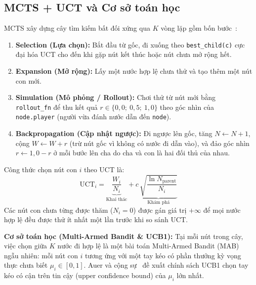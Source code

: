 \documentclass[conference]{IEEEtran}
\begin{document}
\subsection{MCTS + UCT và Cơ sở toán học}
MCTS xây dựng cây tìm kiếm bất đối xứng qua $K$ vòng lặp gồm bốn bước~\cite{coulom2006,kocsis2006}:
\begin{enumerate}
    \item \textbf{Selection (Lựa chọn):} Bắt đầu từ gốc, đi xuống theo \texttt{best\_child(c)} cực đại hóa UCT cho đến khi gặp nút kết thúc hoặc nút chưa mở rộng hết.
    \item \textbf{Expansion (Mở rộng):} Lấy một nước hợp lệ chưa thử và tạo thêm một nút con mới.
    \item \textbf{Simulation (Mô phỏng / Rollout):} Chơi thử từ nút mới bằng \texttt{rollout\_fn} để thu kết quả $r \in \{0{,}0;\ 0{,}5;\ 1{,}0\}$ theo góc nhìn của \texttt{node.player} (người vừa đánh nước dẫn đến \texttt{node}).
    \item \textbf{Backpropagation (Cập nhật ngược):} Đi ngược lên gốc, tăng $N \leftarrow N + 1$, cộng $W \leftarrow W + r$ (trừ nút gốc vì không có nước đi dẫn vào), và đảo góc nhìn $r \leftarrow 1{,}0 - r$ ở mỗi bước lên cha do cha và con là hai đối thủ của nhau.
\end{enumerate}

Công thức chọn nút con $i$ theo UCT là:
\begin{equation}
\text{UCT}_i = \underbrace{\frac{W_i}{N_i}}_{\text{Khai thác}} + c\,\underbrace{\sqrt{\frac{\ln N_{\mathrm{parent}}}{N_i}}}_{\text{Khám phá}}
\label{eq:uct}
\end{equation}
Các nút con chưa từng được thăm ($N_i = 0$) được gán giá trị $+\infty$ để mọi nước hợp lệ đều được thử ít nhất một lần trước khi so sánh UCT.

\textbf{Cơ sở toán học (Multi-Armed Bandit \& UCB1):} Tại mỗi nút trong cây, việc chọn giữa $K$ nước đi hợp lệ là một bài toán Multi-Armed Bandit (MAB) ngẫu nhiên: mỗi nút con $i$ tương ứng với một tay kéo có phần thưởng kỳ vọng thực chưa biết $\mu_i \in [0, 1]$. Auer và cộng sự~\cite{auer2002} đề xuất chính sách UCB1 chọn tay kéo có cận trên tin cậy (upper confidence bound) của $\mu_i$ lớn nhất.
\end{document}
